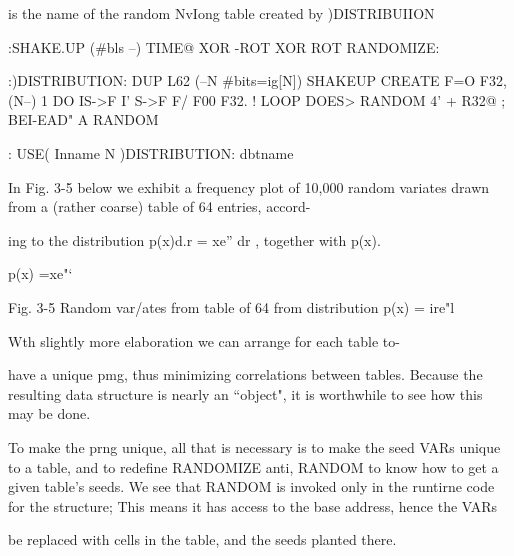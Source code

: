 \distname is the name of the random NvIong table created by )DISTRIBUIION

:SHAKE.UP (#bls --) TIME@ XOR -ROT XOR ROT RANDOMIZE:

\randomlzeseeds
:)DISTRIBUTION: DUP L62 (--N #bits=ig[N])
SHAKEUP \Inlhllzepmg
CREATE F=O F32, \rmkefirstemy
(N--) 1 DO \Nentrytabie
IS->F I' S->F F/ \ltiontstack
F00 F32. \evalmteXOtiiand!
LOOP
DOES> RANDOM 4' + R32@ ;
BEI-EAD" A RANDOM \makethesewordslocd

\Usage: USE( Inname N )DISTRIBUTION: dbtname

In Fig. 3-5 below we exhibit a frequency plot of 10,000 random
variates drawn from a (rather coarse) table of 64 entries, accord-

ing to the distribution p(x)d.r = xe” dr , together with p(x).

 

p(x) =xe"‘

 

 

 

 

 

 

 

 

 

 

 

 

Fig. 3-5 Random var/ates from table of 64 from distribution p(x) = ire"l

Wth slightly more elaboration we can arrange for each table to-

have a unique pmg, thus minimizing correlations between
tables. Because the resulting data structure is nearly an “object",
it is worthwhile to see how this may be done.

To make the prng unique, all that is necessary is to make the seed
VARs unique to a table, and to redeﬁne RANDOMIZE anti,
RANDOM to know how to get a given table’s seeds. We see that
RANDOM is invoked only in the runtirne code for the structure;
This means it has access to the base address, hence the VARs

be replaced with cells in the table, and the seeds planted there.

